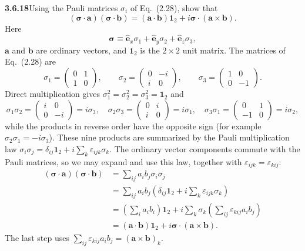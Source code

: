 \par\bigskip
\noindent\textbf{3.6.18}\quad Using the Pauli matrices $\sigma_{i}$ of
Eq.~(2.28), show that
\[
(\boldsymbol{\sigma}\cdot\mathbf{a})(\boldsymbol{\sigma}\cdot\mathbf{b})
=(\mathbf{a}\cdot\mathbf{b})\mathbf{1}_{2}
+i\boldsymbol{\sigma}\cdot(\mathbf{a}\times\mathbf{b}).
\]
Here
\[
\boldsymbol{\sigma}\equiv\hat{\mathbf{e}}_{x}\sigma_{1}
+\hat{\mathbf{e}}_{y}\sigma_{2}+\hat{\mathbf{e}}_{z}\sigma_{3},
\]
$\mathbf{a}$ and $\mathbf{b}$ are ordinary vectors, and $\mathbf{1}_{2}$ is
the $2\times2$ unit matrix.
\solution
The matrices of Eq.~(2.28) are
\[
\sigma_1=\begin{pmatrix}0&1\\1&0\end{pmatrix},\qquad
\sigma_2=\begin{pmatrix}0&-i\\i&0\end{pmatrix},\qquad
\sigma_3=\begin{pmatrix}1&0\\0&-1\end{pmatrix}.
\]
Direct multiplication gives
$\sigma_1^2=\sigma_2^2=\sigma_3^2=\mathbf 1_2$ and
\[
\sigma_1\sigma_2=\begin{pmatrix}i&0\\0&-i\end{pmatrix}=i\sigma_3,\quad
\sigma_2\sigma_3=\begin{pmatrix}0&i\\i&0\end{pmatrix}=i\sigma_1,\quad
\sigma_3\sigma_1=\begin{pmatrix}0&1\\-1&0\end{pmatrix}=i\sigma_2,
\]
while the products in reverse order have the opposite sign (for
example $\sigma_2\sigma_1=-i\sigma_3$). These nine products are
summarized by the Pauli multiplication law
$\sigma_i\sigma_j=\delta_{ij}\mathbf 1_2+i\sum_k\varepsilon_{ijk}\sigma_k$.
The ordinary vector components commute with the Pauli matrices, so we
may expand and use this law, together with
$\varepsilon_{ijk}=\varepsilon_{kij}$:
\[
\begin{aligned}
(\boldsymbol\sigma\cdot\mathbf a)(\boldsymbol\sigma\cdot\mathbf b)
&=\sum_{ij}a_i b_j\sigma_i\sigma_j\\
&=\sum_{ij}a_ib_j\left(\delta_{ij}\mathbf 1_2+
i\sum_k\varepsilon_{ijk}\sigma_k\right)\\
&=\left(\sum_i a_ib_i\right)\mathbf 1_2+
i\sum_k\sigma_k\left(\sum_{ij}\varepsilon_{kij}a_ib_j\right)\\
&=\boxed{(\mathbf a\cdot\mathbf b)\mathbf 1_2+
i\boldsymbol\sigma\cdot(\mathbf a\times\mathbf b)}.
\end{aligned}
\]
The last step uses
$\sum_{ij}\varepsilon_{kij}a_ib_j=(\mathbf a\times\mathbf b)_k$.

